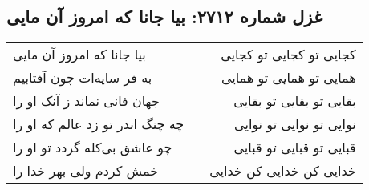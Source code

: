 \begin{center}
\section*{غزل شماره ۲۷۱۲: بیا جانا که امروز آن مایی}
\label{sec:2712}
\begin{longtable}{l p{0.5cm} r}
بیا جانا که امروز آن مایی
&&
کجایی تو کجایی تو کجایی
\\
به فر سایه‌ات چون آفتابیم
&&
همایی تو همایی تو همایی
\\
جهان فانی نماند ز آنک او را
&&
بقایی تو بقایی تو بقایی
\\
چه چنگ اندر تو زد عالم که او را
&&
نوایی تو نوایی تو نوایی
\\
چو عاشق بی‌کله گردد تو او را
&&
قبایی تو قبایی تو قبایی
\\
خمش کردم ولی بهر خدا را
&&
خدایی کن خدایی کن خدایی
\\
\end{longtable}
\end{center}
